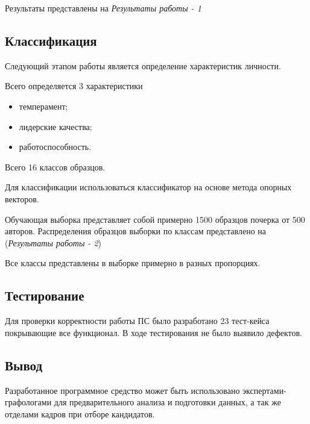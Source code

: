 Результаты представлены на \emph{Результаты работы - 1}

\subsection{Классификация}
Следующий этапом работы является определение характеристик личности.

Всего определяется 3 характеристики
\begin{itemize}
  \item темперамент;
  \item лидерские качества;
  \item работоспособность.
\end{itemize}

Всего 16 классов образцов.

Для классификации использоваться классификатор на основе метода опорных векторов.

Обучающая выборка представляет собой примерно 1500 образцов почерка от 500 авторов.
Распределения образцов выборки по классам представлено на (\emph{Результаты работы - 2})

Все классы представлены в выборке примерно в разных пропорциях.

\subsection{Тестирование}
Для проверки корректности работы ПС было разработано 23 тест-кейса покрывающие все функционал. В ходе тестирования не было выявило дефектов. 

\subsection{Вывод}
Разработанное программное средство может быть использовано экспертами-графологами для предварительного анализа и подготовки данных, а так же отделами кадров при отборе кандидатов.